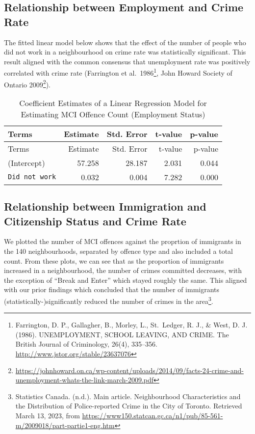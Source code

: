 \documentclass[
]{article}
\begin{document}
\hypertarget{relationship-between-employment-and-crime-rate}{%
\subsection{Relationship between Employment and Crime
Rate}\label{relationship-between-employment-and-crime-rate}}

The fitted linear model below shows that the effect of the number of
people who did not work in a neighbourhood on crime rate was
statistically significant. This result aligned with the common consensus
that unemployment rate was positively correlated with crime rate
(Farrington et al.~1986\footnote{Farrington, D. P., Gallagher, B.,
  Morley, L., St.~Ledger, R. J., \& West, D. J. (1986). UNEMPLOYMENT,
  SCHOOL LEAVING, AND CRIME. The British Journal of Criminology, 26(4),
  335--356. \url{http://www.jstor.org/stable/23637076}}, John Howard
Society of Ontario 2009\footnote{\url{https://johnhoward.on.ca/wp-content/uploads/2014/09/facts-24-crime-and-unemployment-whats-the-link-march-2009.pdf}}).

\begin{longtable}[]{@{}lrrrr@{}}
\caption{Coefficient Estimates of a Linear Regression Model for
Estimating MCI Offence Count (Employment Status)}\tabularnewline
\toprule()
Terms & Estimate & Std. Error & t-value & p-value \\
\midrule()
\endfirsthead
\toprule()
Terms & Estimate & Std. Error & t-value & p-value \\
\midrule()
\endhead
(Intercept) & 57.258 & 28.187 & 2.031 & 0.044 \\
\texttt{Did\ not\ work} & 0.032 & 0.004 & 7.282 & 0.000 \\
\bottomrule()
\end{longtable}

\hypertarget{relationship-between-immigration-and-citizenship-status-and-crime-rate}{%
\subsection{Relationship between Immigration and Citizenship Status and
Crime
Rate}\label{relationship-between-immigration-and-citizenship-status-and-crime-rate}}

We plotted the number of MCI offences against the proprtion of
immigrants in the 140 neighbourhoods, separated by offence type and also
included a total count. From these plots, we can see that as the
proportion of immigrants increased in a neighbourhood, the number of
crimes committed decreases, with the exception of ``Break and Enter''
which stayed roughly the same. This aligned with our prior findings
which concluded that the number of immigrants
(statistically-)significantly reduced the number of crimes in the
area\footnote{Statistics Canada. (n.d.). Main article. Neighbourhood
  Characteristics and the Distribution of Police-reported Crime in the
  City of Toronto. Retrieved March 13, 2023, from
  \url{https://www150.statcan.gc.ca/n1/pub/85-561-m/2009018/part-partie1-eng.htm}}.
\end{document}
